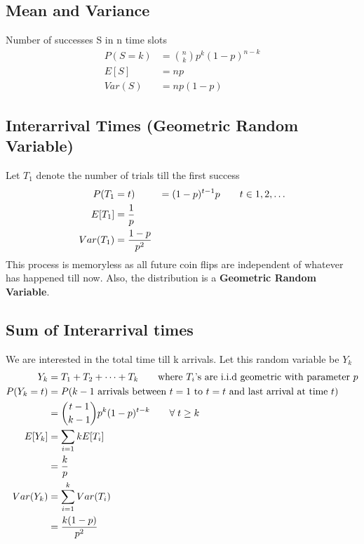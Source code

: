 \documentclass[../probability-notes.tex]{subfiles}
\begin{document}
    \subsection{Mean and Variance}
    Number of successes S in n time slots
    \begin{align*}
        P(S=k) &= \binom{n}{k} p^{k}(1-p)^{n-k}\\
        E[S] &= np\\
        Var(S) &= np(1-p)
    \end{align*}

    \subsection{Interarrival Times (Geometric Random Variable)}
    Let $T_{1}$ denote the number of trials till the first success
    \begin{align*}
        P(T_{1} &= t) &= (1-p)^{t-1}p \tag*{$t \in {1, 2, \ldots}$}\\
        E[T_{1}] &= \frac{1}{p}\\
        Var(T_{1}) &= \frac{1-p}{p^{2}}
    \end{align*}
    This process is memoryless as all future coin flips are independent of whatever has happened till now. Also, the distribution is a \textbf{Geometric Random Variable}.

    \subsection{Sum of Interarrival times}
    We are interested in the total time till k arrivals. Let this random variable be $Y_{k}$
    \begin{align*}
        Y_{k} &= T_{1} + T_{2} + \cdots + T_{k} \tag*{where $T_{i}$'s are i.i.d geometric with parameter $p$}\\
        P(Y_{k} = t) &= P(\text{$k-1$ arrivals between $t=1$ to $t=t$ and last arrival at time $t$})\\
           &= \binom{t-1}{k-1}p^{k}(1-p)^{t-k} \tag*{$\forall\; t \geq k$}\\
        E[Y_{k}] &= \sum_{i=1}{k}E[T_{i}]\\
                &= \frac{k}{p}\\
        Var(Y_{k}) &= \sum_{i=1}^{k}Var(T_{i})\\
                    &= \frac{k(1-p)}{p^{2}}
    \end{align*}


\end{document}
